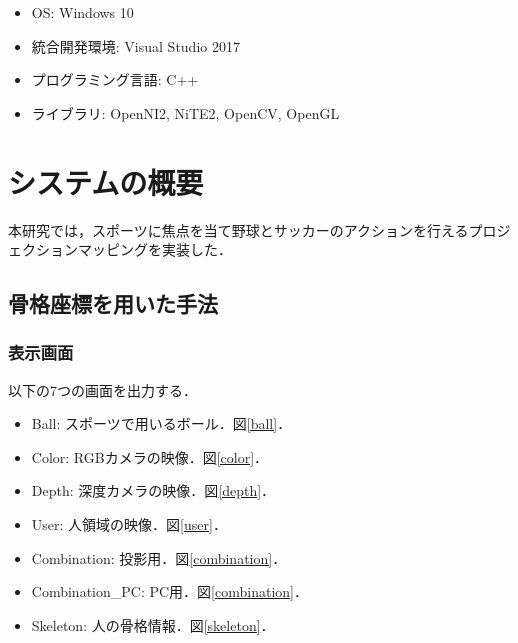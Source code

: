 \begin{itemize}
    \item OS: Windows 10
    \item 統合開発環境: Visual Studio 2017
    \item プログラミング言語: C++
    \item ライブラリ: OpenNI2, NiTE2, OpenCV, OpenGL
\end{itemize}

\section{システムの概要}
本研究では，スポーツに焦点を当て野球とサッカーのアクションを行えるプロジェクションマッピングを実装した．


\subsection{骨格座標を用いた手法}
\subsubsection{表示画面}
\label{kokkaku}
以下の7つの画面を出力する．

\begin{itemize}
    \item Ball: スポーツで用いるボール．図\ref{ball}．
    \item Color: RGBカメラの映像．図\ref{color}．
    \item Depth: 深度カメラの映像．図\ref{depth}．
    \item User: 人領域の映像．図\ref{user}．
    \item Combination: 投影用．図\ref{combination}．
    \item Combination\_PC: PC用．図\ref{combination}．
    \item Skeleton: 人の骨格情報．図\ref{skeleton}．
\end{itemize}

\clearpage

